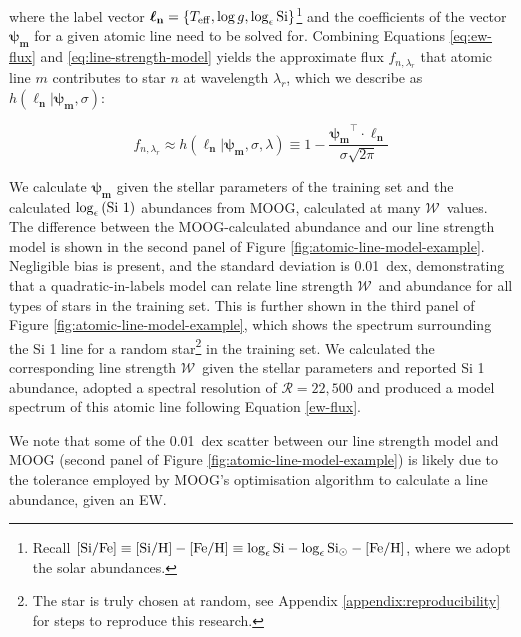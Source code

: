 \documentclass[useAMS,usenatbib]{mn2e}
\newcommand\lv{\mathbf{\boldsymbol\ell_n}}
\newcommand{\logeps}[1]{\log_{\epsilon}{\rm #1}}
\newcommand\ew{$\mathcal{W}$}
\newcommand\psiv{\mathbf{\boldsymbol{\psi}_m}}
\begin{document}
\noindent{}where the label vector 
$\lv = \{T_{\rm eff},\log{g},\log_{\epsilon}{\rm Si}\}$\footnote{Recall
${\rm [Si/Fe]} \equiv {\rm [Si/H]} - {\rm [Fe/H]} \equiv \log_{\epsilon}{\rm Si} 
- \log_{\epsilon}{\rm Si}_\odot - {\rm [Fe/H]}$, where we adopt the \citet{Asplund2009}
solar abundances.} and the coefficients of the vector $\psiv$ for a given 
atomic line need to be solved for. Combining Equations \ref{eq:ew-flux} and
\ref{eq:line-strength-model} yields the approximate flux $f_{n,\lambda_r}$ that 
atomic line $m$ contributes to star $n$ at wavelength $\lambda_r$, which we
describe as $h(\lv|\psiv,\sigma)$:

\begin{equation}
f_{n,\lambda_r} \approx h(\lv|\psiv,\sigma,\lambda) \equiv 1 - \frac{\psiv^{\intercal}\cdot\lv}{\sigma\sqrt{2\pi}}
\end{equation}

We calculate $\psiv$ given the stellar parameters of the training set and the
calculated $\logeps{(Si~1)}$ abundances from MOOG, calculated at many \ew\ values.
The difference between the MOOG-calculated abundance and our line strength model
is shown in the second panel of Figure \ref{fig:atomic-line-model-example}.
Negligible bias is present, and the standard deviation is 0.01~dex, demonstrating
that a quadratic-in-labels model can relate line strength \ew\ and abundance
for all types of stars in the training set. This is further shown in the third panel of 
Figure \ref{fig:atomic-line-model-example},
which shows the spectrum surrounding the Si 1 line for a random star\footnote{The
star is truly chosen at random, see Appendix \ref{appendix:reproducibility} for steps
to reproduce this research.} in the training set. We calculated the corresponding
line strength \ew\ given the stellar parameters and reported Si 1 abundance, 
adopted a spectral resolution of $\mathcal{R} = 22,500$ and produced a model 
spectrum of this atomic line following Equation \ref{ew-flux}. 

We note that some of the 0.01~dex scatter between our line strength model and 
MOOG (second panel of Figure \ref{fig:atomic-line-model-example}) is likely due to 
the tolerance employed by MOOG's optimisation algorithm to calculate a line 
abundance, given an EW. 

\end{document}
